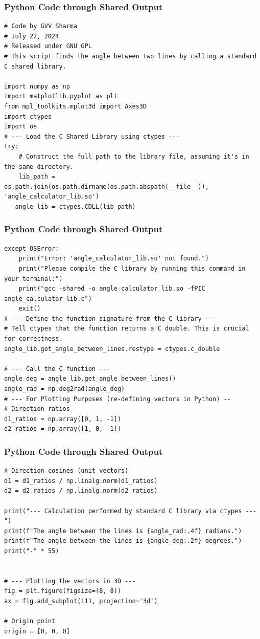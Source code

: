 \documentclass{beamer}
\begin{document}
\begin{frame}[fragile]
\frametitle{Python Code through Shared Output}
\begin{lstlisting}
# Code by GVV Sharma
# July 22, 2024
# Released under GNU GPL
# This script finds the angle between two lines by calling a standard C shared library.

import numpy as np
import matplotlib.pyplot as plt
from mpl_toolkits.mplot3d import Axes3D
import ctypes
import os
# --- Load the C Shared Library using ctypes ---
try:
    # Construct the full path to the library file, assuming it's in the same directory.
    lib_path = os.path.join(os.path.dirname(os.path.abspath(__file__)), 'angle_calculator_lib.so')
   angle_lib = ctypes.CDLL(lib_path)

    \end{lstlisting}
\end{frame}  
\begin{frame}[fragile]
\frametitle{Python Code through Shared Output}
\begin{lstlisting}
except OSError:
    print("Error: 'angle_calculator_lib.so' not found.")
    print("Please compile the C library by running this command in your terminal:")
    print("gcc -shared -o angle_calculator_lib.so -fPIC angle_calculator_lib.c")
    exit()
# --- Define the function signature from the C library ---
# Tell ctypes that the function returns a C double. This is crucial for correctness.
angle_lib.get_angle_between_lines.restype = ctypes.c_double

# --- Call the C function ---
angle_deg = angle_lib.get_angle_between_lines()
angle_rad = np.deg2rad(angle_deg)
# --- For Plotting Purposes (re-defining vectors in Python) --
# Direction ratios
d1_ratios = np.array([0, 1, -1])
d2_ratios = np.array([1, 0, -1])
\end{lstlisting}
\end{frame}  
\begin{frame}[fragile]
\frametitle{Python Code through Shared Output}
\begin{lstlisting}
# Direction cosines (unit vectors)
d1 = d1_ratios / np.linalg.norm(d1_ratios)
d2 = d2_ratios / np.linalg.norm(d2_ratios)

print("--- Calculation performed by standard C library via ctypes ---")
print(f"The angle between the lines is {angle_rad:.4f} radians.")
print(f"The angle between the lines is {angle_deg:.2f} degrees.")
print("-" * 55)


# --- Plotting the vectors in 3D ---
fig = plt.figure(figsize=(8, 8))
ax = fig.add_subplot(111, projection='3d')

# Origin point
origin = [0, 0, 0]
\end{lstlisting}
\end{frame}  
\end{document}
